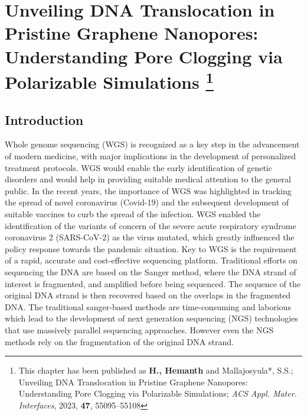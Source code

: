\chapter[Unveiling DNA Translocation in Pristine Graphene Nanopores: Understanding Pore Clogging via Polarizable Simulations]{Unveiling DNA Translocation in Pristine Graphene Nanopores: Understanding Pore Clogging via Polarizable Simulations \protect\footnote[5]{This chapter has been published as \textbf{H., Hemanth} and Mallajosyula*, S.S.; Unveiling DNA Translocation in Pristine Graphene Nanopores: Understanding Pore Clogging via Polarizable Simulations; {\textit{ACS Appl. Mater. Interfaces}, 2023, \textbf{47}, 55095–55108}}}

\section[Introduction]{Introduction}
Whole genome sequencing (WGS) is recognized as a key step in the advancement of modern medicine, with major implications in the development of personalized treatment protocols.\supercite{dewey_clinical_2014} WGS would enable the early identification of genetic disorders and would help in providing suitable medical attention to the general public.\supercite{abubaker_bagabir_covid-19_2022} In the recent years, the importance of WGS was highlighted in tracking the spread of novel coronavirus (Covid-19) and the subsequent development of suitable vaccines to curb the spread of the infection.\supercite{chen_next-generation_2021} WGS enabled the identification of the variants of concern of the severe acute respiratory syndrome coronavirus 2 (SARS-CoV-2) as the virus mutated, which greatly influenced the policy response towards the pandemic situation.\supercite{abubaker_bagabir_covid-19_2022,chen_next-generation_2021} Key to WGS is the requirement of a rapid, accurate and cost-effective sequencing platform.\supercite{giani_long_2020} Traditional efforts on sequencing the DNA are based on the Sanger method, where the DNA strand of interest is fragmented, and amplified before being sequenced.\supercite{sanger_dna_1977} The sequence of the original DNA strand is then recovered based on the overlaps in the fragmented DNA. The traditional sanger-based methods are time-consuming and laborious which lead to the development of next generation sequencing (NGS) technologies that use massively parallel sequencing approaches.\supercite{manyana_hiv-1_2021} However even the NGS methods rely on the fragmentation of the original DNA strand.

